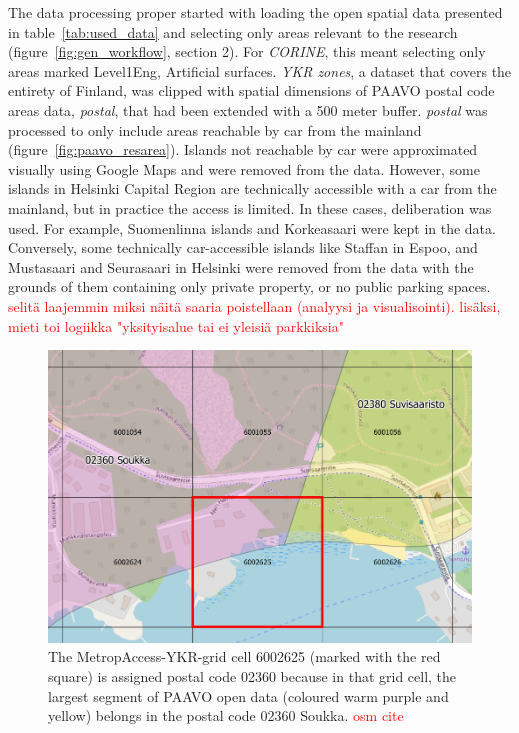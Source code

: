 The data processing proper started with loading the open spatial data presented in table~\ref{tab:used_data} and selecting only areas relevant to the research (figure~\ref{fig:gen_workflow}, section 2). For \textit{CORINE}, this meant selecting only areas marked Level1Eng, Artificial surfaces. \textit{YKR zones}, a dataset that covers the entirety of Finland, was clipped with spatial dimensions of PAAVO postal code areas data, \textit{postal}, that had been extended with a 500 meter buffer. \textit{postal} was processed to only include areas reachable by car from the mainland (figure~\ref{fig:paavo_resarea}). Islands not reachable by car were approximated visually using Google Maps and were removed from the data. However, some islands in Helsinki Capital Region are technically accessible with a car from the mainland, but in practice the access is limited. In these cases, deliberation was used. For example, Suomenlinna islands and Korkeasaari were kept in the data. Conversely, some technically car-accessible islands like Staffan in Espoo, and Mustasaari and Seurasaari in Helsinki were removed from the data with the grounds of them containing only private property, or no public parking spaces. \textcolor{red}{selitä laajemmin miksi näitä saaria poistellaan (analyysi ja visualisointi). lisäksi, mieti toi logiikka "yksityisalue tai ei yleisiä parkkiksia"}

\begin{figure}[H]%
    \includegraphics[width=\textwidth]{images/paavo-ykr.png}
    \caption[Assigning MetropAccess-YKR-grid postal codes]{The MetropAccess-YKR-grid cell 6002625 (marked with the red square) is assigned postal code 02360 because in that grid cell, the largest segment of PAAVO open data (coloured warm purple and yellow) belongs in the postal code 02360 Soukka. \textcolor{red}{osm cite}}%
    \label{fig:paavo_ykr}%
\end{figure}


